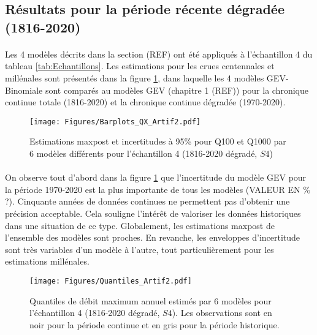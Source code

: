 \documentclass[11pt]{article}
\begin{document}
	\FloatBarrier	
	
	\subsection{Résultats pour la période récente dégradée (1816-2020)}
	
	\paragraph{} 
	Les 4 modèles décrits dans la section (REF) ont été appliqués à l'échantillon 4 du tableau \ref{tab:Echantillons}. Les estimations pour les crues centennales et millénales sont présentés dans la figure \ref{fig:Barplot_Artif2}, dans laquelle les 4 modèles GEV-Binomiale sont comparés au modèles GEV (chapitre 1 (REF)) pour la chronique continue totale (1816-2020) et la chronique continue dégradée (1970-2020). 
	
	\begin{figure}[h]
		\centering
		\texttt{[image: Figures/Barplots\_QX\_Artif2.pdf]}	
		\caption{Estimations maxpost et incertitudes à 95\% pour Q100 et Q1000 par 6 modèles différents pour l'échantillon 4 (1816-2020 dégradé, $S4$)}
		\label{fig:Barplot_Artif2}
	\end{figure}
	
	\paragraph{} On observe tout d'abord dans la figure \ref{fig:Barplot_Artif2} que l'incertitude du modèle GEV pour la période 1970-2020 est la plus importante de tous les modèles (VALEUR EN \% ?). Cinquante années de données continues ne permettent pas d'obtenir une précision acceptable. Cela souligne l'intérêt de valoriser les données historiques dans une situation de ce type. Globalement, les estimations maxpost de l'ensemble des modèles sont proches. En revanche, les enveloppes d'incertitude sont très variables d'un modèle à l'autre, tout particulièrement pour les estimations millénales. 	
	
	\begin{figure}[h]
		\centering
		\texttt{[image: Figures/Quantiles\_Artif2.pdf]}	
		\caption{Quantiles de débit maximum annuel estimés par 6 modèles pour l'échantillon 4 (1816-2020 dégradé, $S4$). Les observations sont en noir pour la période continue et en gris pour la période historique.}
		\label{fig:Quantiles_Artif2}
	\end{figure}
	
\end{document}
